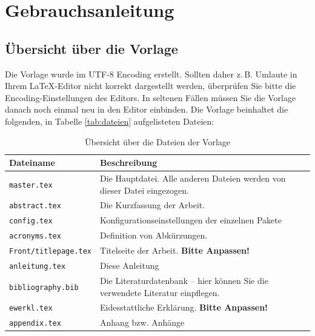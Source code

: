 \chapter{Gebrauchsanleitung}

\section{Übersicht über die Vorlage}
Die Vorlage wurde im UTF-8 Encoding erstellt. Sollten daher z.\,B. Umlaute in Ihrem \LaTeX-Editor nicht korrekt dargestellt werden, überprüfen Sie bitte die Encoding-Ein\-stel\-lun\-gen des Editors. In seltenen Fällen müssen Sie die Vorlage danach noch einmal neu in den Editor einbinden. 
Die Vorlage beinhaltet die folgenden, in Tabelle \vref{tab:dateien} aufgelisteten Dateien: 
\begin{table}[h!]
	\centering
\begin{tabular}{lp{10cm}}
	\textbf{Dateiname} & \textbf{Beschreibung}\\\toprule
	\texttt{master.tex} & Die Hauptdatei. Alle anderen Dateien werden von dieser Datei eingezogen. \\
	\texttt{abstract.tex} & Die Kurzfassung der Arbeit. \\	
	\texttt{config.tex} & Konfigurationseinstellungen 	 der einzelnen Pakete\\
	\texttt{acronyms.tex} & Definition von Abkürzungen. \\
	\texttt{Front/titlepage.tex} & Titelseite der Arbeit. \textbf{Bitte Anpassen!}\\
	\texttt{anleitung.tex} & Diese Anleitung\\ 
	\texttt{bibliography.bib}&  Die Literaturdatenbank -- hier können Sie die verwendete Literatur einpflegen.\\
	\texttt{ewerkl.tex} & Eidesstattliche Erklärung. \textbf{Bitte Anpassen!}\\
	\texttt{appendix.tex} & Anhang bzw. Anhänge \\\bottomrule
\end{tabular}
\caption{\label{tab:dateien}Übersicht über die Dateien der Vorlage}
\end{table}

